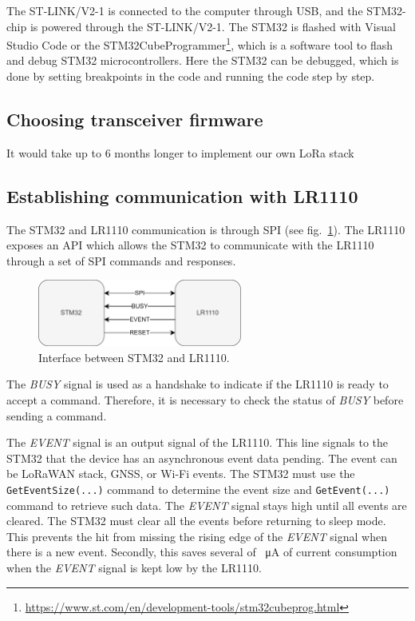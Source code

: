 The ST-LINK/V2-1 is connected to the computer through \ac{USB}, and the STM32-chip is powered through the ST-LINK/V2-1. The STM32 is flashed with Visual Studio Code or the STM32CubeProgrammer\footnote{\url{https://www.st.com/en/development-tools/stm32cubeprog.html}}, which is a software tool to flash and debug STM32 microcontrollers. Here the STM32 can be debugged, which is done by setting breakpoints in the code and running the code step by step.

\subsection{Choosing transceiver firmware}
It would take up to 6 months longer to implement our own \ac{LoRa} stack

\subsection{Establishing communication with LR1110}
The STM32 and LR1110 communication is through \ac{SPI} (see fig.~\ref{fig:stm32_lr1110_interface}). The LR1110 exposes an \ac{API} which allows the STM32 to communicate with the LR1110 through a set of \ac{SPI} commands and responses.

\begin{figure}[H]
    \centering
    \includegraphics[width=0.6\textwidth]{figures/STM32_LR1110_interface.png}
    \caption{Interface between STM32 and LR1110.}
    \label{fig:stm32_lr1110_interface}
\end{figure}

The \textit{BUSY} signal is used as a handshake to indicate if the LR1110 is ready to accept a command. Therefore, it is necessary to check the status of \textit{BUSY} before sending a command.

The \textit{EVENT} signal is an output signal of the LR1110. This line signals to the STM32 that the device has an asynchronous event data pending. The event can be \ac{LoRaWAN} stack, \ac{GNSS}, or Wi-Fi events. The STM32 must use the \lstinline[style=C++]{GetEventSize(...)} command to determine the event size and \lstinline[style=C++]{GetEvent(...)} command to retrieve such data. The \textit{EVENT} signal stays high until all events are cleared. The STM32 must clear all the events before returning to sleep mode. This prevents the hit from missing the rising edge of the \textit{EVENT} signal when there is a new event. Secondly, this saves several of \SI{}{\micro\ampere} of current consumption when the \textit{EVENT} signal is kept low by the LR1110.

